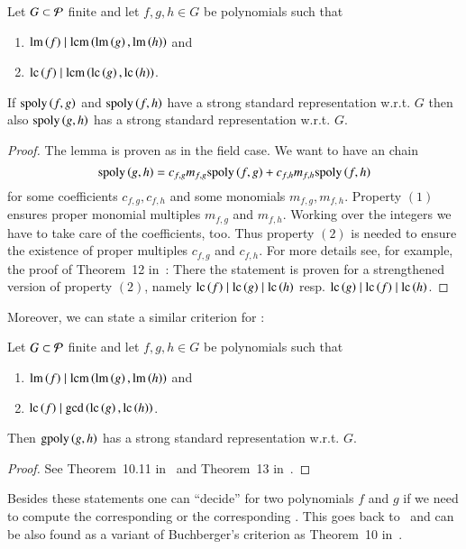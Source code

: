 \begin{lemma}
Let $G \subset \mathcal{P}$ finite and let $f,g,h \in G$ be polynomials such that
\begin{enumerate}
\item $\operatorname{lm}\left({f}\right) \mid \operatorname{lcm}\left(\operatorname{lm}\left({g}\right), \operatorname{lm}\left({h}\right)\right)$ and
\item $\mathrm{lc}\left({f}\right) \mid \operatorname{lcm}\left(\mathrm{lc}\left({g}\right), \mathrm{lc}\left({h}\right)\right)$.
\end{enumerate}
If $\mathrm{spoly}\left({f},{g}\right)$ and $\mathrm{spoly}\left({f},{h}\right)$ have a strong standard representation w.r.t.
$G$ then also $\mathrm{spoly}\left({g},{h}\right)$ has a strong standard representation w.r.t. $G$.
\label{thm:chain-crit}
\end{lemma}

\begin{proof}
The lemma is proven as in the field case. We want to have an \spt chain
\[\mathrm{spoly}\left({g},{h}\right) = c_{f,g} m_{f,g} \mathrm{spoly}\left({f},{g}\right) + c_{f,h} m_{f,h} \mathrm{spoly}\left({f},{h}\right)\]
for some coefficients $c_{f,g}, c_{f,h}$ and  some monomials $m_{f,g}, m_{f,h}$.
Property $(1)$ ensures proper monomial multiples $m_{f,g}$ and $m_{f,h}$.
Working over the integers we have to take care of the coefficients, too. Thus
property $(2)$ is needed to ensure the existence of proper multiples $c_{f,g}$
and $c_{f,h}$. For more details see, for example, the proof of Theorem~12
in~\cite{lichtblau2012}: There the statement is proven for a strengthened
version of property $(2)$, namely $\mathrm{lc}\left({f}\right) \mid \mathrm{lc}\left({g}\right) \mid \mathrm{lc}\left({h}\right)$ resp. $\mathrm{lc}\left({g}\right)
\mid \mathrm{lc}\left({f}\right) \mid \mathrm{lc}\left({h}\right)$.
\end{proof}

Moreover, we can state a similar criterion for \gpts:

\begin{lemma}
Let $G \subset \mathcal{P}$ finite and let $f,g,h \in G$ be polynomials such that
\begin{enumerate}
\item $\operatorname{lm}\left({f}\right) \mid \operatorname{lcm}\left(\operatorname{lm}\left({g}\right), \operatorname{lm}\left({h}\right)\right)$ and
\item $\mathrm{lc}\left({f}\right) \mid \gcd\left(\mathrm{lc}\left({g}\right), \mathrm{lc}\left({h}\right)\right)$.
\end{enumerate}
Then $\mathrm{gpoly}\left({g},{h}\right)$ has a strong standard representation w.r.t. $G$.
\label{thm:chain-crit-gcd}
\end{lemma}

\begin{proof}
See Theorem~10.11 in~\cite{bwkGroebnerBases1993} and Theorem~13
in~\cite{lichtblau2012}.
\end{proof}

Besides these statements one can ``decide'' for two polynomials $f$ and
$g$ if we need to compute the corresponding \gpt or the corresponding \spt.
This goes back to~\cite{kapur1988} and can be also found as a variant of
Buchberger's criterion as Theorem~10 in~\cite{lichtblau2012}.

